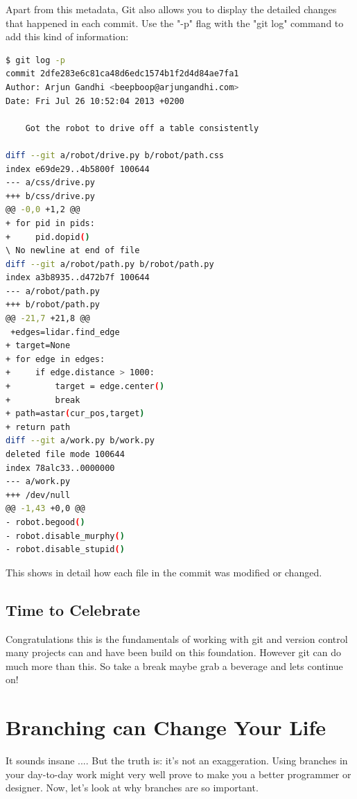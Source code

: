 \documentclass{article}
\begin{document}
Apart from this metadata, Git also allows you to display the detailed changes that happened in each commit. Use the "-p" flag with the "git log" command to add this kind of information:

\begin{lstlisting}[language=bash]
$ git log -p
commit 2dfe283e6c81ca48d6edc1574b1f2d4d84ae7fa1
Author: Arjun Gandhi <beepboop@arjungandhi.com>
Date: Fri Jul 26 10:52:04 2013 +0200

    Got the robot to drive off a table consistently

diff --git a/robot/drive.py b/robot/path.css
index e69de29..4b5800f 100644
--- a/css/drive.py
+++ b/css/drive.py
@@ -0,0 +1,2 @@
+ for pid in pids:
+     pid.dopid()
\ No newline at end of file
diff --git a/robot/path.py b/robot/path.py
index a3b8935..d472b7f 100644
--- a/robot/path.py
+++ b/robot/path.py
@@ -21,7 +21,8 @@
 +edges=lidar.find_edge
+ target=None
+ for edge in edges:
+     if edge.distance > 1000:
+         target = edge.center()
+         break
+ path=astar(cur_pos,target)
+ return path
diff --git a/work.py b/work.py
deleted file mode 100644
index 78alc33..0000000
--- a/work.py
+++ /dev/null
@@ -1,43 +0,0 @@
- robot.begood()
- robot.disable_murphy()
- robot.disable_stupid()
\end{lstlisting}

This shows in detail how each file in the commit was modified or changed. %

\subsection{Time to Celebrate}
Congratulations this is the fundamentals of working with git and version control many projects can and have been build on this foundation. However git can do much more than this. So take a break maybe grab a beverage and lets continue on!

\section{Branching can Change Your Life}
It sounds insane .... But the truth is: it's not an exaggeration. Using branches in your day-to-day work might very well prove to make you a better programmer or designer.
\newline\newline
Now, let's look at why branches are so important.
\end{document}
